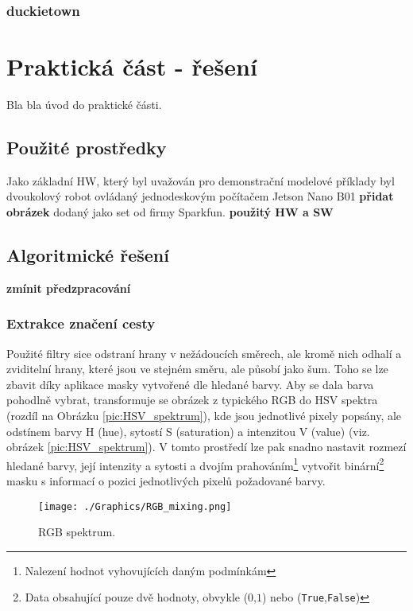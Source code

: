 \documentclass[czech, bc, kky, he, iso690alph]{fasthesis}
\begin{document}
    		\subsection{duckietown}
    \chapter{Praktická část - řešení}
        Bla bla úvod do praktické části.
        \section{Použité prostředky}
            Jako základní HW, který byl uvažován pro demonstrační modelové příklady byl dvoukolový robot ovládaný jednodeskovým počítačem Jetson Nano B01 \textbf{přidat obrázek} dodaný jako set od firmy Sparkfun.
            \textbf{použitý HW a SW}
        \section{Algoritmické řešení}
        \textbf{zmínit předzpracování}
            \subsection{Extrakce značení cesty}
            	Použité filtry sice odstraní hrany v nežádoucích směrech, ale kromě nich odhalí a zviditelní hrany, které jsou ve stejném směru, ale působí jako šum. Toho se lze zbavit díky aplikace masky vytvořené dle hledané barvy. Aby se dala barva pohodlně vybrat, transformuje se obrázek z typického RGB do HSV spektra (rozdíl na Obrázku \ref{pic:HSV_spektrum}), kde jsou jednotlivé pixely popsány, ale odstínem barvy H (hue), sytostí S (saturation) a intenzitou V (value) (viz. obrázek \ref{pic:HSV_spektrum}). V tomto prostředí lze pak snadno nastavit rozmezí hledané barvy, její intenzity a sytosti a dvojím prahováním\footnote{Nalezení hodnot vyhovujících daným podmínkám} vytvořit binární\footnote{Data obsahující pouze dvě hodnoty, obvykle (\(0\),\(1\)) nebo (\verb"True",\verb"False")} masku s informací o pozici jednotlivých pixelů požadované barvy.\\
            	\begin{figure}[ht]
            		\centering
            		\texttt{[image: ./Graphics/RGB\_mixing.png]}
            		\caption{RGB spektrum.}
            	\end{figure}
            	
\end{document}
